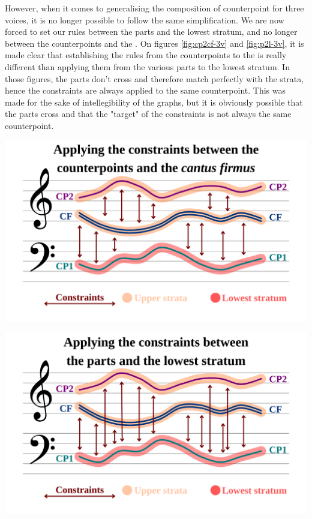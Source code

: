 However, when it comes to generalising the composition of counterpoint for three voices, it is no longer possible to follow the same simplification. We are now forced to set our rules between the parts and the lowest stratum, and no longer between the counterpoints and the \cf. On figures \ref{fig:cp2cf-3v} and \ref{fig:p2l-3v}, it is made clear that establishing the rules from the counterpoints to the \cfs is really different than applying them from the various parts to the lowest stratum. In those figures, the parts don't cross and therefore match perfectly with the strata, hence the constraints are always applied to the same counterpoint. This was made for the sake of intellegibility of the graphs, but it is obviously possible that the parts cross and that the "target" of the constraints is not always the same counterpoint.

\vspace{.5cm}
\begin{minipage}{0.46\textwidth}
    \centering
    \includegraphics[width=\textwidth]{Images/cp2cf-3v.png}
    \label{fig:cp2cf-3v}
    \end{minipage}
    \hfill
    \begin{minipage}{0.46\textwidth}
      \centering
      \includegraphics[width=\textwidth]{Images/p2l-3v.png}
      \label{fig:p2l-3v}
\end{minipage}
\vspace{.5cm}


